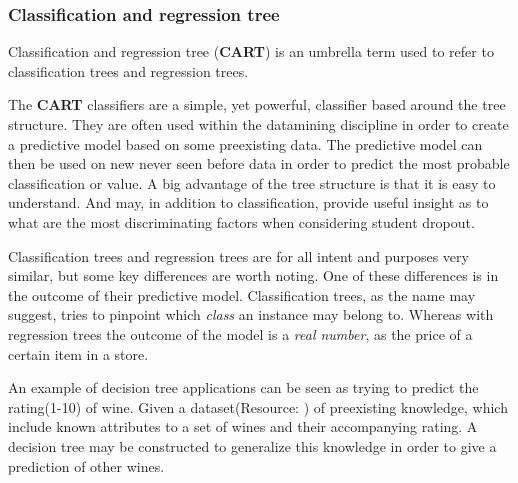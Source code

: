 \subsubsection{Classification and regression tree}\label{sec:tree}
	Classification and regression tree (\textbf{CART}) is an umbrella term used to refer to
	classification trees and regression trees\cite{trees:umbrella}.

	\bigskip\noindent The \textbf{CART} classifiers are a simple, yet powerful, classifier based around the tree structure. 
	They are often used within the datamining discipline in order to create a predictive model based on some preexisting data.
	The predictive model can then be used on new never seen before data in order to predict the most probable classification or value. 
	A big advantage of the tree structure is that it is easy to understand. 
	And may, in addition to classification, provide useful insight as to what are the most discriminating factors when considering student dropout. 
	
	\bigskip\noindent Classification trees and regression trees are for all intent and purposes very similar, but some key differences are worth noting. 
	One of these differences is in the outcome of their predictive model. 
	Classification trees, as the name may suggest, tries to pinpoint which \textit{class} an instance may belong to. 
	Whereas with regression trees the outcome of the model is a \textit{real number}, as the price of a certain item in a store. 
	
	\bigskip\noindent
	An example of decision tree applications can be seen as trying to predict the rating(1-10) of wine. 
	Given a dataset(Resource: \cite{mining:datasetexample}) of preexisting knowledge, which include known attributes to a set of wines and their accompanying rating.
	A decision tree may be constructed to generalize this knowledge in order to give a prediction of other wines. 	
		
	
